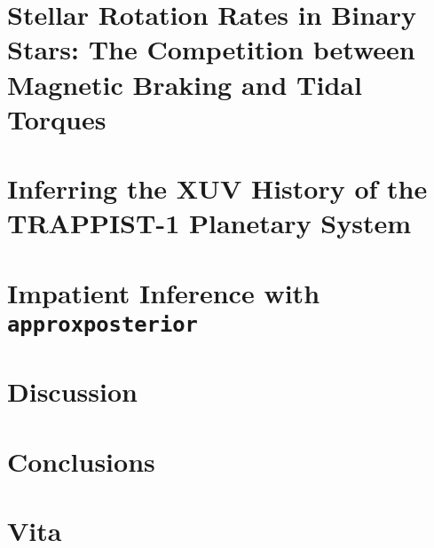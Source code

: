 \documentclass [11pt, proquest]{uwthesis}[2016/11/22] %
\newcommand{\approxposterior}[0]{\texttt{approxposterior}\xspace}
\begin{document}
\chapter{Stellar Rotation Rates in Binary Stars: The Competition between Magnetic Braking and Tidal Torques}
%

\chapter{Inferring the XUV History of the TRAPPIST-1 Planetary System}
%

\chapter{Impatient Inference with \approxposterior}
%

\chapter{Discussion}
%

\chapter{Conclusions}
%

%

\printendnotes

%
%

%
%

\appendix
\raggedbottom\sloppy

\chapter{Vita}

\end{document}
